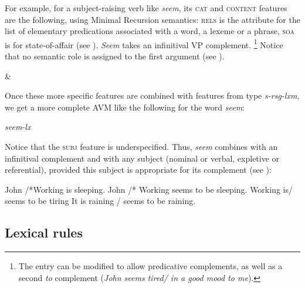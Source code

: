 \documentclass[output=paper
	        ,collection
	        ,collectionchapter
 	        ,biblatex
                ,babelshorthands
                ,newtxmath
                ,draftmode
                ,colorlinks, citecolor=brown
]{langscibook}
\begin{document}
For example, for a subject-raising verb like \emph{seem}, its \textsc{cat} and \textsc{content} features are the following, using Minimal Recursion semantics: \textsc{rels} is the attribute for the list of elementary predications associated with a word, a lexeme or a phrase, \textsc{soa} is for state-of-affair (see ). \emph{Seem} takes an infinitival VP complement.%
%
\footnote{The entry can be modified to allow predicative complements, as well as a second \emph{to} complement (\emph{John seems tired/ in a good mood to me}).}
%
Notice that no semantic role is assigned to the first argument (see ).

\ea\label{ex:prop23}
 \impl {} \&
\z

Once these more specific features are combined with features from type \emph{s-rsg-lxm}, we get a more complete AVM like the following for the word \emph{seem}:

\ea\label{ex:prop24}
\emph{seem-lx} \impl
{}
\z

Notice that the \textsc{subj} feature is underspecified. Thus, \emph{seem} combines with an infinitival complement and with any subject (nominal or verbal, expletive or referential), provided this subject is appropriate for its complement (see ):

\ea\label{ex:prop25}
	\ea John /*Working is sleeping.
	\ex John /* Working seems to be sleeping.
	\ex Working is/ seems to be tiring
	\ex It is raining / seems to be raining.
	\z
\z

\subsection{Lexical rules}
\end{document}
